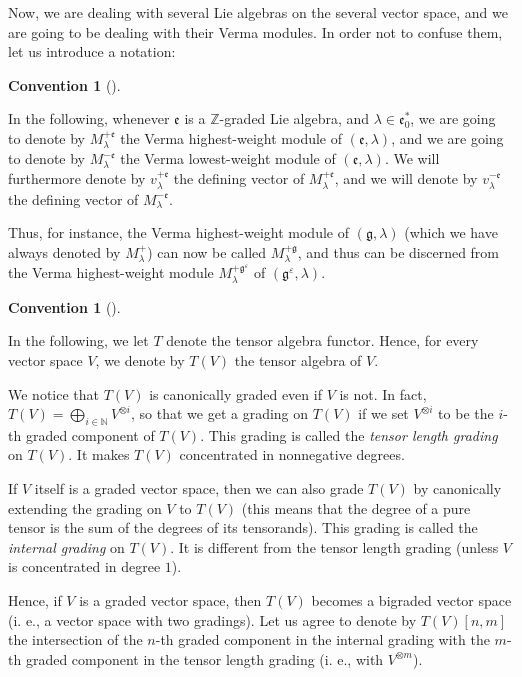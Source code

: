 \documentclass
[numbers=enddot,12pt,final,onecolumn,german,notitlepage]{scrartcl}%
\theoremstyle{definition}
\newtheorem{conv}[theo]{Convention}
\newenvironment{Convention}[1][]
{\begin{conv}[#1]\begin{leftbar}}
{\end{leftbar}\end{conv}}
\begin{document}
Now, we are dealing with several Lie algebras on the several vector space, and
we are going to be dealing with their Verma modules. In order not to confuse
them, let us introduce a notation:

\begin{Convention}
In the following, whenever $\mathfrak{e}$ is a $\mathbb{Z}$-graded Lie
algebra, and $\lambda\in\mathfrak{e}_{0}^{\ast}$, we are going to denote by
$M_{\lambda}^{+\mathfrak{e}}$ the Verma highest-weight module of $\left(
\mathfrak{e},\lambda\right)  $, and we are going to denote by $M_{\lambda
}^{-\mathfrak{e}}$ the Verma lowest-weight module of $\left(  \mathfrak{e}%
,\lambda\right)  $. We will furthermore denote by $v_{\lambda}^{+\mathfrak{e}%
}$ the defining vector of $M_{\lambda}^{+\mathfrak{e}}$, and we will denote by
$v_{\lambda}^{-\mathfrak{e}}$ the defining vector of $M_{\lambda
}^{-\mathfrak{e}}$.
\end{Convention}

Thus, for instance, the Verma highest-weight module of $\left(  \mathfrak{g}%
,\lambda\right)  $ (which we have always denoted by $M_{\lambda}^{+}$) can now
be called $M_{\lambda}^{+\mathfrak{g}}$, and thus can be discerned from the
Verma highest-weight module $M_{\lambda}^{+\mathfrak{g}^{\varepsilon}}$ of
$\left(  \mathfrak{g}^{\varepsilon},\lambda\right)  $.

\begin{Convention}
In the following, we let $T$ denote the tensor algebra functor. Hence, for
every vector space $V$, we denote by $T\left(  V\right)  $ the tensor algebra
of $V$.

We notice that $T\left(  V\right)  $ is canonically graded even if $V$ is not.
In fact, $T\left(  V\right)  =\bigoplus\limits_{i\in\mathbb{N}}V^{\otimes i}$,
so that we get a grading on $T\left(  V\right)  $ if we set $V^{\otimes i}$ to
be the $i$-th graded component of $T\left(  V\right)  $. This grading is
called the \textit{tensor length grading} on $T\left(  V\right)  $. It makes
$T\left(  V\right)  $ concentrated in nonnegative degrees.

If $V$ itself is a graded vector space, then we can also grade $T\left(
V\right)  $ by canonically extending the grading on $V$ to $T\left(  V\right)
$ (this means that the degree of a pure tensor is the sum of the degrees of
its tensorands). This grading is called the \textit{internal grading} on
$T\left(  V\right)  $. It is different from the tensor length grading (unless
$V$ is concentrated in degree $1$).

Hence, if $V$ is a graded vector space, then $T\left(  V\right)  $ becomes a
bigraded vector space (i. e., a vector space with two gradings). Let us agree
to denote by $T\left(  V\right)  \left[  n,m\right]  $ the intersection of the
$n$-th graded component in the internal grading with the $m$-th graded
component in the tensor length grading (i. e., with $V^{\otimes m}$).
\end{Convention}
\end{document}
